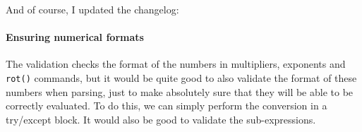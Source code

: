 \documentclass[../development.tex]{subfiles}
\begin{document}



And of course, I updated the changelog:


\paragraph{Ensuring numerical formats\label{development:making-v0.2.2:parsing-parentheses:ensuring-numerical-formats}}

The validation checks the format of the numbers in multipliers, exponents and \texttt{rot()} commands, but it would be quite good to also validate the format of these numbers when parsing, just to make absolutely sure that they will be able to be correctly evaluated. To do this, we can simply perform the conversion in a try/except block. It would also be good to validate the sub-expressions.

\end{document}
